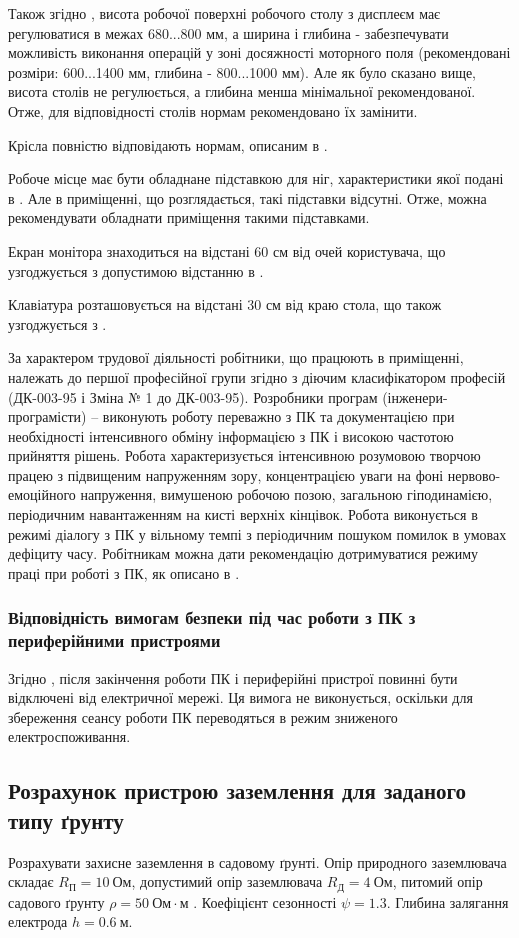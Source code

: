 \documentclass[a4paper,12pt]{article}
\begin{document}
Також згідно \cite{sanpin798}, висота робочої поверхні робочого столу з дисплеєм має регулюватися в межах 680...800 мм, а ширина і глибина - забезпечувати можливість виконання операцій у зоні досяжності моторного поля (рекомендовані розміри: 600...1400 мм, глибина - 800...1000 мм). Але як було сказано вище, висота столів не регулюється, а глибина менша мінімальної рекомендованої. Отже, для відповідності столів нормам рекомендовано їх замінити.

Крісла повністю відповідають нормам, описаним в \cite{sanpin798}.

Робоче місце має бути обладнане підставкою для ніг, характеристики якої подані в \cite{sanpin798}. Але в приміщенні, що розглядається, такі підставки відсутні. Отже, можна рекомендувати обладнати приміщення такими підставками.

Екран монітора знаходиться на відстані 60 см від очей користувача, що узгоджується з допустимою відстанню в \cite{sanpin798}.

Клавіатура розташовується на відстані 30 см від краю стола, що також узгоджується з \cite{sanpin798}.

За характером трудової діяльності робітники, що працюють в приміщенні, належать до першої професійної групи згідно з діючим класифікатором професій (ДК-003-95 і Зміна № 1 до ДК-003-95). Розробники програм (інженери-програмісти) -- виконують роботу переважно з ПК та документацією при необхідності інтенсивного обміну інформацією з ПК і високою частотою прийняття рішень. Робота характеризується інтенсивною розумовою творчою працею з підвищеним напруженням зору, концентрацією уваги на фоні нервово-емоційного напруження, вимушеною робочою позою, загальною гіподинамією, періодичним навантаженням на кисті верхніх кінцівок. Робота виконується в режимі діалогу з ПК у вільному темпі з періодичним пошуком помилок в умовах дефіциту часу. Робітникам можна дати рекомендацію дотримуватися режиму праці при роботі з ПК, як описано в \cite{sanpin798}.

\subsubsection{Відповідність вимогам безпеки під час роботи з ПК з периферійними пристроями}
Згідно \cite{npaop1210}, після закінчення роботи ПК і периферійні пристрої повинні бути відключені від електричної мережі. Ця вимога не виконується, оскільки для збереження сеансу роботи ПК переводяться в режим зниженого електроспоживання.

\subsection{Розрахунок пристрою заземлення для заданого типу ґрунту}
Розрахувати захисне заземлення в садовому ґрунті. Опір природного заземлювача складає $R_\text{П}=10\ \text{Ом}$, допустимий опір заземлювача $R_\text{Д}=4\ \text{Ом}$, питомий опір садового ґрунту $\rho=50\ \text{Ом}\cdot\text{м}$ \cite{burakova}. Коефіцієнт сезонності $\psi = 1.3$. Глибина залягання електрода $h = 0.6\ \text{м}$.
\end{document}
